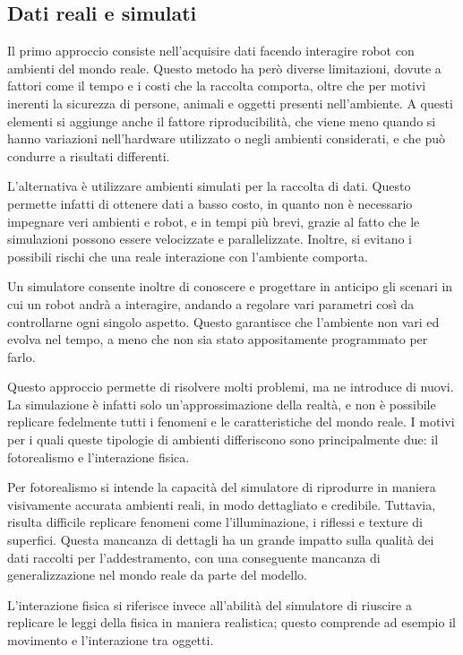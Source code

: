 \documentclass[12pt]{report}
\begin{document}
\subsection{Dati reali e simulati}
\label{sec:dati_reali_e_simulati}

Il primo approccio consiste nell'acquisire dati facendo interagire robot con ambienti del mondo reale. Questo metodo ha però diverse limitazioni, dovute a fattori come il tempo e i costi che la raccolta comporta, oltre che per motivi inerenti la sicurezza di persone, animali e oggetti presenti nell'ambiente. A questi elementi si aggiunge anche il fattore riproducibilità, che viene meno quando si hanno variazioni nell'hardware utilizzato o negli ambienti considerati, e che può condurre a risultati differenti.

L'alternativa è utilizzare ambienti simulati per la raccolta di dati. Questo permette infatti di ottenere dati a basso costo, in quanto non è necessario impegnare veri ambienti e robot, e in tempi più brevi, grazie al fatto che le simulazioni possono essere velocizzate e parallelizzate. Inoltre, si evitano i possibili rischi che una reale interazione con l'ambiente comporta.

Un simulatore consente inoltre di conoscere e progettare in anticipo gli scenari in cui un robot andrà a interagire, andando a regolare vari parametri così da controllarne ogni singolo aspetto. Questo garantisce che l'ambiente non vari ed evolva nel tempo, a meno che non sia stato appositamente programmato per farlo.

Questo approccio permette di risolvere molti problemi, ma ne introduce di nuovi. La simulazione è infatti solo un'approssimazione della realtà, e non è possibile replicare fedelmente tutti i fenomeni e le caratteristiche del mondo reale. I motivi per i quali queste tipologie di ambienti differiscono sono principalmente due: il fotorealismo e l'interazione fisica.

Per fotorealismo si intende la capacità del simulatore di riprodurre in maniera visivamente accurata ambienti reali, in modo dettagliato e credibile. Tuttavia, risulta difficile replicare fenomeni come l'illuminazione, i riflessi e texture di superfici. Questa mancanza di dettagli ha un grande impatto sulla qualità dei dati raccolti per l'addestramento, con una conseguente mancanza di generalizzazione nel mondo reale da parte del modello.

L'interazione fisica si riferisce invece all'abilità del simulatore di riuscire a replicare le leggi della fisica in maniera realistica; questo comprende ad esempio il movimento e l'interazione tra oggetti. 
\end{document}
